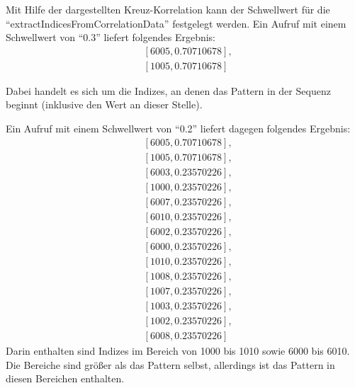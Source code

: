 \begin{samepage}
Mit Hilfe der dargestellten Kreuz-Korrelation kann der Schwellwert für die \enquote{extractIndicesFromCorrelationData} festgelegt werden.
Ein Aufruf mit einem Schwellwert von \enquote{0.3} liefert folgendes Ergebnis: \\
\begin{align*}
   & [6005, 0.70710678], \\
   & [1005, 0.70710678]
\end{align*}

Dabei handelt es sich um die Indizes, an denen das Pattern in der Sequenz beginnt (inklusive den Wert an dieser Stelle). \\
\end{samepage}
\begin{samepage}
Ein Aufruf mit einem Schwellwert von \enquote{0.2} liefert dagegen folgendes Ergebnis: \\
\begin{align*}
  &  [6005, 0.70710678], \\
  & [1005, 0.70710678], \\
  & [6003, 0.23570226], \\
  & [1000, 0.23570226], \\
  & [6007, 0.23570226], \\
  & [6010, 0.23570226], \\
  & [6002, 0.23570226], \\
  & [6000, 0.23570226], \\
  & [1010, 0.23570226], \\
  & [1008, 0.23570226], \\
  & [1007, 0.23570226], \\
  & [1003, 0.23570226], \\
  & [1002, 0.23570226], \\
 & [6008, 0.23570226]
\end{align*}
Darin enthalten sind Indizes im Bereich von 1000 bis 1010 sowie 6000 bis 6010. Die Bereiche sind größer als das Pattern selbst, allerdings ist das Pattern in diesen Bereichen enthalten.
\end{samepage}